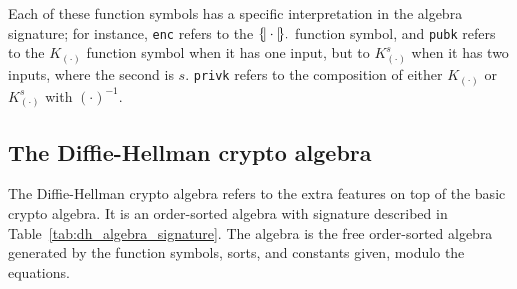 Each of these function symbols has a specific interpretation in the
algebra signature; for instance, \texttt{enc} refers to the
$\{\!|\cdot|\!\}_{\cdot}$ function symbol, and \texttt{pubk} refers to the
$K_{(\cdot)}$ function symbol when it has one input, but to
$K^s_{(\cdot)}$ when it has two inputs, where the second is $s$.
\texttt{privk} refers to the composition of either $K_{(\cdot)}$ or
$K^s_{(\cdot)}$ with $(\cdot)^{-1}$.

\subsection{The Diffie-Hellman crypto algebra}
\label{sec:input:dh}

The Diffie-Hellman crypto algebra refers to the extra features on top
of the basic crypto algebra. It is an order-sorted algebra with signature
described in Table~\ref{tab:dh_algebra_signature}.  The algebra is
the free order-sorted algebra generated by the function symbols,
sorts, and constants given, modulo the equations.

